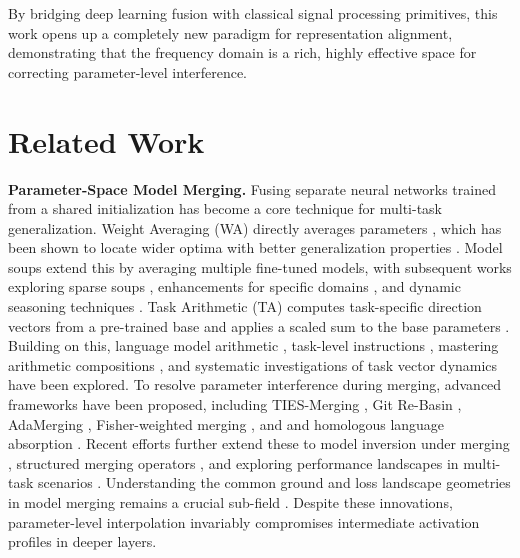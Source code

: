 \documentclass{article}
\begin{document}
By bridging deep learning fusion with classical signal processing primitives, this work opens up a completely new paradigm for representation alignment, demonstrating that the frequency domain is a rich, highly effective space for correcting parameter-level interference.

\section{Related Work}
\label{sec:related}
\textbf{Parameter-Space Model Merging.} Fusing separate neural networks trained from a shared initialization has become a core technique for multi-task generalization. Weight Averaging (WA) directly averages parameters \citep{wortsman2022model, choshen2022fusing}, which has been shown to locate wider optima with better generalization properties \citep{izmailov2018averaging, entezari2022role}. Model soups \citep{Wortsman2022ModelSA} extend this by averaging multiple fine-tuned models, with subsequent works exploring sparse soups \citep{Zimmer2023SparseMS}, enhancements for specific domains \citep{Wasfy2023EnhancingLS, Dansereau2023ModelST}, and dynamic seasoning techniques \citep{Croce2023SeasoningMS}. Task Arithmetic (TA) computes task-specific direction vectors from a pre-trained base and applies a scaled sum to the base parameters \citep{ilharco2022editing, Ilharco2022EditingMW}. Building on this, language model arithmetic \citep{Bhardwaj2024LanguageMA}, task-level instructions \citep{Sun2025TaskAI}, mastering arithmetic compositions \citep{Yoshida2025MasteringTA}, and systematic investigations of task vector dynamics \citep{Braga2025InvestigatingTA} have been explored. To resolve parameter interference during merging, advanced frameworks have been proposed, including TIES-Merging \citep{yadav2023ties}, Git Re-Basin \citep{ainsworth2023git, Ainsworth2022GitRM}, AdaMerging \citep{yang2024adamerging}, Fisher-weighted merging \citep{matena2022merging}, and and homologous language absorption \citep{yu2024language}. Recent efforts further extend these to model inversion under merging \citep{Li2025ModelMI}, structured merging operators \citep{Tang2025MergingMO, Wei2025ModelingMM}, and exploring performance landscapes in multi-task scenarios \citep{Wu2025UnlockingEL, Marczak2025NoTL}. Understanding the common ground and loss landscape geometries in model merging remains a crucial sub-field \citep{Khan2024SoKOF, Horoi2024HarmonyID, Lim2024TheEI, Ersoy2025PhaseTR}. Despite these innovations, parameter-level interpolation invariably compromises intermediate activation profiles in deeper layers.
\end{document}
